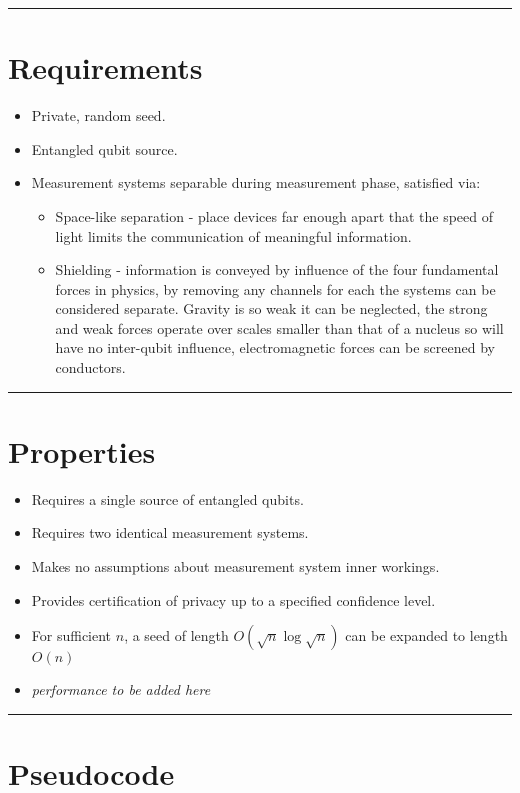 \documentclass[12pt,letterpaper]{article}
\begin{document}
\rule{\textwidth}{2pt}
\section*{Requirements}
\begin{itemize}[noitemsep]
    \item Private, random seed.
    \item Entangled qubit source.
    \item Measurement systems separable during measurement phase, satisfied via:
    \begin{itemize}[noitemsep]
        \item Space-like separation - place devices far enough apart that the speed of light limits the communication of meaningful information.
        \item Shielding - information is conveyed by influence of the four fundamental forces in physics, by removing any channels for each the systems can be considered separate. Gravity is so weak it can be neglected, the strong and weak forces operate over scales smaller than that of a nucleus so will have no inter-qubit influence, electromagnetic forces can be screened by conductors.
    \end{itemize}
\end{itemize}

\rule{\textwidth}{2pt}
\section*{Properties}

\begin{itemize}[noitemsep]
    \item Requires a single source of entangled qubits.
    \item Requires two identical measurement systems.
    \item Makes no assumptions about measurement system inner workings.
    \item Provides certification of privacy up to a specified confidence level.
    \item For sufficient $n$, a seed of length $O(\sqrt{n}\log{\sqrt{n}})$ can be expanded to length $O(n)$
    \item \emph{performance to be added here}
\end{itemize}

\rule{\textwidth}{2pt}
\section*{Pseudocode}
\end{document}
